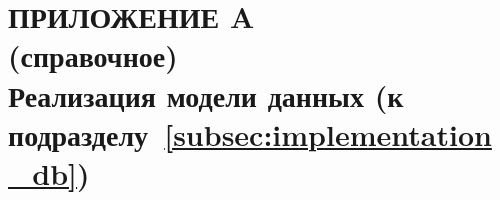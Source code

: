 \renewcommand{\thefigure}{\Asbuk{section}.\arabic{figure}}
\renewcommand{\thetable}{\Asbuk{section}.\arabic{table}}
\renewcommand{\thelstlisting}{\Asbuk{section}.\arabic{lstlisting}}

\fancyhf{} %
\fancyfoot[R]{\thepage}
\setlength{\footskip}{-2.5mm}
\setlength{\headheight}{8mm}

\thispagestyle{plain}
\section*{%
  ПРИЛОЖЕНИЕ A \\
  (справочное) \\
  Реализация модели данных
  (к подразделу~\ref{subsec:implementation_db})
}

\setcounter{section}{1}
\setcounter{figure}{0}
\setcounter{table}{0}
\setcounter{lstlisting}{0}

\vspace{-\baselineskip}

\pagebreak